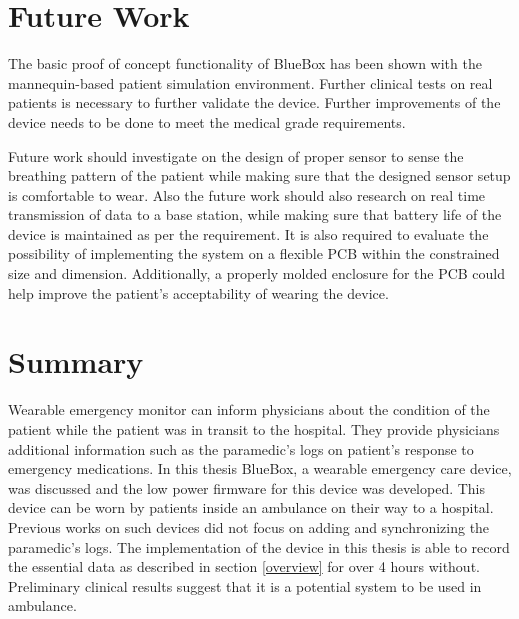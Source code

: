 \section{Future Work}
The basic proof of concept functionality of BlueBox has been shown with the  mannequin-based patient simulation environment. Further clinical tests on real patients is necessary to further validate the device. Further improvements of the  device needs to be done to meet the medical grade requirements.  

Future work should investigate on the design of proper sensor to sense the breathing pattern of the patient while making sure that the designed sensor setup is comfortable to wear. Also the future work should also research on real time transmission of data to a base station, while making sure that battery life of the device is maintained as per the requirement. It is also required to evaluate the possibility of implementing the system on a flexible PCB within the constrained size and dimension. Additionally, a properly molded enclosure for the PCB could help improve the patient's acceptability of wearing the device. 
\section{Summary}
Wearable emergency monitor can inform physicians about the condition of the patient while the patient was in transit to the hospital. They provide physicians additional information such as the paramedic's logs on patient's response to emergency medications. In this thesis BlueBox, a wearable emergency care device, was discussed and the low power firmware for this device was developed. This device can be worn by patients inside an ambulance on their way to a hospital. Previous works on such devices did not focus on adding and synchronizing the paramedic's logs. The implementation of the device in this thesis is able to record the essential data as described in section \ref{overview} for over 4 hours without. Preliminary clinical results suggest that it is a potential system to be used in ambulance.